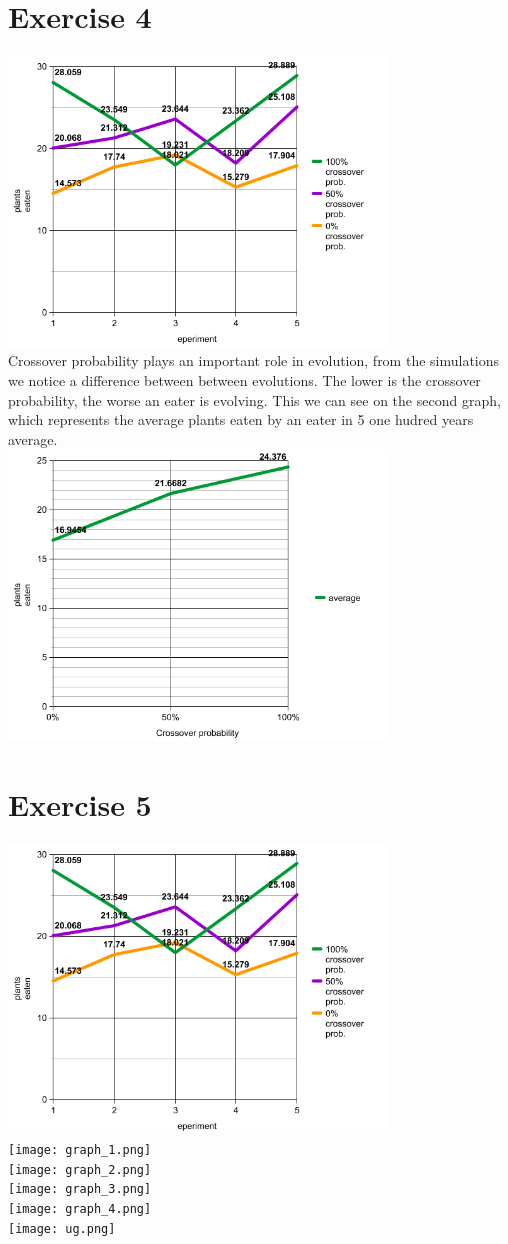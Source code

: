 \documentclass[a4paper,10pt]{article}
\begin{document}
\section*{Exercise 4}
\includegraphics[width=10cm]{graph.png}\\
Crossover probability plays an important role in evolution, from the simulations we notice a difference between
between evolutions. The lower is the crossover probability, the worse an eater is evolving. This we can see on
the second graph, which represents the average plants eaten by an eater in 5 one hudred years average.\\
\includegraphics[width=10cm]{graph4.png}\\

\section*{Exercise 5}

\includegraphics[width=10cm]{graph.png}\\
\texttt{[image: graph\_1.png]}\\
\texttt{[image: graph\_2.png]}\\
\texttt{[image: graph\_3.png]}\\
\texttt{[image: graph\_4.png]}\\
\texttt{[image: ug.png]}\\
\end{document}

